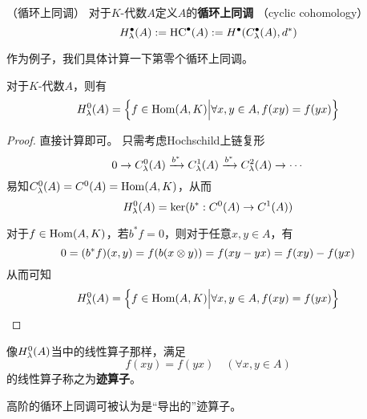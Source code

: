 
\begin{definition}（循环上同调）
对于$K$-代数$A$定义$A$的\textbf{循环上同调}
（cyclic cohomology）
$$H^{\bullet}_{\lambda}(A):=\operatorname{HC}^{\bullet}(A)
:=H^{\bullet}(C_{\lambda}^{\bullet}(A),d^*)$$
\end{definition}

作为例子，我们具体计算一下第零个循环上同调。

\begin{example}对于$K$-代数$A$，则有
$$H^0_{\lambda}(A)=\Big\{ f\in\operatorname{Hom}(A,K) \Big| 
\forall x,y\in A,f(xy)=f(yx) \Big\}$$
\end{example}

\begin{proof}直接计算即可。
只需考虑Hochschild上链复形
$$0\to C^0_\lambda(A)\xrightarrow{b^*}C^1_{\lambda}(A)
\xrightarrow{b^*}C^2_{\lambda}(A)\to\cdots$$
易知$C^0_{\lambda}(A)=C^0(A)=\operatorname{Hom}(A,K)$，从而
$$H^0_{\lambda}(A)=\ker(b^*:C^0(A)\to C^1(A))$$

对于$f\in\operatorname{Hom}(A,K)$，若$b^*f=0$，则对于任意$x,y\in A$，有
$$0=(b^*f)(x,y)=f(b(x\otimes y))=f(xy-yx)=f(xy)-f(yx)$$
从而可知
$$H^0_{\lambda}(A)=\Big\{ f\in\operatorname{Hom}(A,K) \Big| 
\forall x,y\in A,f(xy)=f(yx) \Big\}$$
\end{proof}

像$H^0_{\lambda}(A)$当中的线性算子那样，满足
$$f(xy)=f(yx)\quad(\forall x,y\in A)$$
的线性算子称之为\textbf{迹算子}。

高阶的循环上同调可被认为是“导出的”迹算子。









